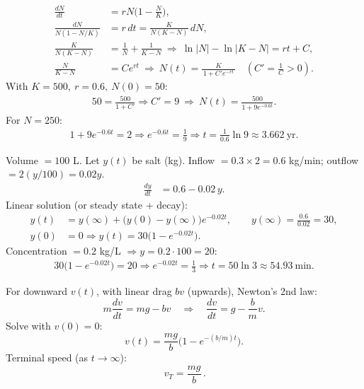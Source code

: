 \documentclass[11pt]{article}
\begin{document}
\begin{solution}
\begin{align*}
\frac{dN}{dt} &= rN\!\Big(1-\frac{N}{K}\Big),\\
\frac{dN}{N(1-N/K)} &= r\,dt
= \frac{K}{N(K-N)}\,dN,\\[2pt]
\frac{K}{N(K-N)} &= \frac{1}{N}+\frac{1}{K-N}
\ \Rightarrow\ 
\ln|N|-\ln|K-N| = rt + C,\\
\frac{N}{K-N} &= C e^{rt}
\ \Rightarrow\ 
N(t)=\frac{K}{\,1+C' e^{-rt}\,}\quad (C'=\tfrac{1}{C}>0).
\end{align*}
With $K=500,\ r=0.6,\ N(0)=50$:
\begin{align*}
50=\frac{500}{1+C'} \Rightarrow C'=9
\ \Rightarrow\ 
N(t)=\frac{500}{1+9e^{-0.6t}}.
\end{align*}
For $N=250$:
\begin{align*}
1+9e^{-0.6t}=2 \Rightarrow e^{-0.6t}=\frac{1}{9}
\Rightarrow t=\frac{1}{0.6}\ln 9 \approx 3.662\ \text{yr}.
\end{align*}
\end{solution}

\begin{solution}
Volume $=100$ L. Let $y(t)$ be salt (kg). Inflow $=0.3\times2=0.6$ kg/min; outflow $=2(y/100)=0.02y$.
\begin{align*}
\frac{dy}{dt}&=0.6-0.02\,y.
\end{align*}
Linear solution (or steady state + decay):
\begin{align*}
y(t)&=y(\infty)+\big(y(0)-y(\infty)\big)e^{-0.02t},\qquad
y(\infty)=\frac{0.6}{0.02}=30,\\
y(0)&=0 \Rightarrow y(t)=30\big(1-e^{-0.02t}\big).
\end{align*}
Concentration $=0.2$ kg/L $\Rightarrow y=0.2\cdot100=20$:
\begin{align*}
30\big(1-e^{-0.02t}\big)=20
\Rightarrow e^{-0.02t}=\frac{1}{3}
\Rightarrow t=50\ln 3\approx 54.93\ \text{min}.
\end{align*}
\end{solution}


\begin{solution}
For downward $v(t)$, with linear drag $bv$ (upwards), Newton’s 2nd law:
\[
m\frac{dv}{dt}=mg-bv\quad\Rightarrow\quad \frac{dv}{dt}=g-\frac{b}{m}v.
\]
Solve with $v(0)=0$:
\[
v(t)=\frac{mg}{b}\Big(1-e^{-(b/m)t}\Big).
\]
Terminal speed (as $t\to\infty$):
\[
\boxed{\,v_T=\dfrac{mg}{b}\,}.
\]
\end{solution}
\end{document}
